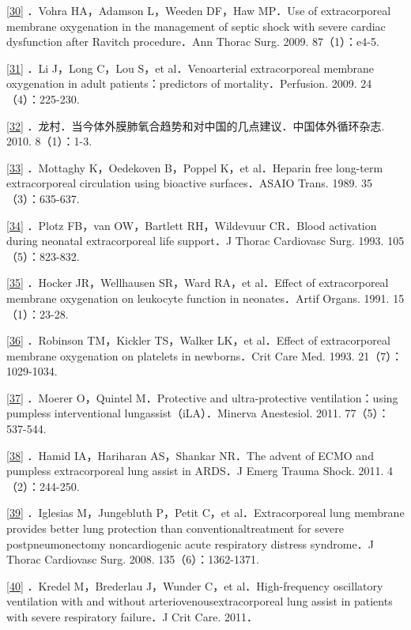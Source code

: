 \protect\hyperlink{text00030.htmlux5cux23ch30-29-back}{{[}30{]}} ．Vohra
HA，Adamson L，Weeden DF，Haw MP．Use of extracorporeal membrane
oxygenation in the management of septic shock with severe cardiac
dysfunction after Ravitch procedure．Ann Thorac Surg. 2009.
87（1）：e4-5.

\protect\hyperlink{text00030.htmlux5cux23ch31-29-back}{{[}31{]}} ．Li
J，Long C，Lou S，et al．Venoarterial extracorporeal membrane
oxygenation in adult patients：predictors of mortality．Perfusion. 2009.
24（4）：225-230.

\protect\hyperlink{text00030.htmlux5cux23ch32-29-back}{{[}32{]}}
．龙村．当今体外膜肺氧合趋势和对中国的几点建议．中国体外循环杂志. 2010.
8（1）：1-3.

\protect\hyperlink{text00030.htmlux5cux23ch33-29-back}{{[}33{]}}
．Mottaghy K，Oedekoven B，Poppel K，et al．Heparin free long-term
extracorporeal circulation using bioactive surfaces．ASAIO Trans. 1989.
35（3）：635-637.

\protect\hyperlink{text00030.htmlux5cux23ch34-29-back}{{[}34{]}} ．Plotz
FB，van OW，Bartlett RH，Wildevuur CR．Blood activation during neonatal
extracorporeal life support．J Thorac Cardiovasc Surg. 1993.
105（5）：823-832.

\protect\hyperlink{text00030.htmlux5cux23ch35-29-back}{{[}35{]}}
．Hocker JR，Wellhausen SR，Ward RA，et al．Effect of extracorporeal
membrane oxygenation on leukocyte function in neonates．Artif Organs.
1991. 15（1）：23-28.

\protect\hyperlink{text00030.htmlux5cux23ch36-29-back}{{[}36{]}}
．Robinson TM，Kickler TS，Walker LK，et al．Effect of extracorporeal
membrane oxygenation on platelets in newborns．Crit Care Med. 1993.
21（7）：1029-1034.

\protect\hyperlink{text00030.htmlux5cux23ch37-29-back}{{[}37{]}}
．Moerer O，Quintel M．Protective and ultra-protective
ventilation：using pumpless interventional lungassist（iLA）．Minerva
Anestesiol. 2011. 77（5）：537-544.

\protect\hyperlink{text00030.htmlux5cux23ch38-29-back}{{[}38{]}} ．Hamid
IA，Hariharan AS，Shankar NR．The advent of ECMO and pumpless
extracorporeal lung assist in ARDS．J Emerg Trauma Shock. 2011.
4（2）：244-250.

\protect\hyperlink{text00030.htmlux5cux23ch39-29-back}{{[}39{]}}
．Iglesias M，Jungebluth P，Petit C，et al．Extracorporeal lung membrane
provides better lung protection than conventionaltreatment for severe
postpneumonectomy noncardiogenic acute respiratory distress syndrome．J
Thorac Cardiovasc Surg. 2008. 135（6）：1362-1371.

\protect\hyperlink{text00030.htmlux5cux23ch40-29-back}{{[}40{]}}
．Kredel M，Brederlau J，Wunder C，et al．High-frequency oscillatory
ventilation with and without arteriovenousextracorporeal lung assist in
patients with severe respiratory failure．J Crit Care. 2011．

\protect\hypertarget{text00031.html}{}{}

